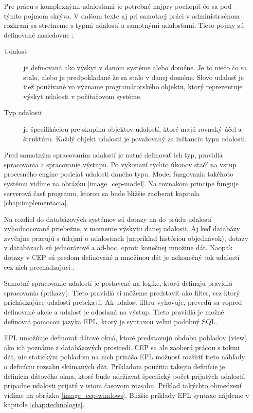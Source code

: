 	Pre prácu s komplexnými udalosťami je potrebné najprv pochopiť čo sa pod týmto pojmom skrýva. V ďalšom texte aj pri samotnej práci v administračnom rozhraní sa stretneme s typmi udalostí a samotnými udalosťami. Tieto pojmy sú definované nasledovne \cite{etzion2011event}:
	
	\begin{description}
		\item[Udalosť] je definovaná ako výskyt v danom systéme alebo doméne. Je to niečo čo sa stalo, alebo je predpokladané že sa stalo v danej doméne. Slovo udalosť je tiež používané vo význame programátorského objektu, ktorý reprezentuje výskyt udalosti v počítačovom systéme.
		
		\item[Typ udalosti] je špecifikáciou pre skupinu objektov udalostí, ktoré majú rovnaký účel a štruktúru. Každý objekt udalosti je považovaný za inštanciu typu udalosti.
	\end{description}

	Pred samotným spracovaním udalostí je nutné definovať ich typ, pravidlá spracovania a spracovanie výstupu. Po vykonaní týchto úkonov stačí na vstup procesného engine posielať udalosti daného typu. Model fungovania takéhoto systému vidíme na obrázku \ref{image_cep-model}. Na rovnakom princípe funguje serverová časť programu, ktorou sa bude bližšie zaoberať kapitola \ref{chap:implementacia}.
	
	Na rozdiel do databázových systémov sú dotazy na do prúdu udalostí vyhodnocované priebežne, v momente výskytu danej udalosti. Aj keď databázy zvyčajne pracujú s údajmi o udalostiach (napríklad históriou objednávok), dotazy v databázach sú jednorázové a ad-hoc, oproti konečnej množine dát. Naopak dotazy v CEP sú predom definované a množinou dát je nekonečný tok udalostí cez nich prechádzajúci \cite{web:ceptranslated}.
		
	Samotné spracovanie udalostí je postavené na logike, ktorú definujú pravidlá spracovania (príkazy). Tieto pravidlá si môžeme predstaviť ako filter, cez ktorý prichádzajúce udalosti pretekajú. Ak udalosť filtru vyhovuje, prevedú sa vopred definované akcie a udalosť je odoslaná na výstup.	Tieto pravidlá je možné definovať pomocou jazyka EPL, ktorý je syntaxou veľmi podobný SQL.
	
	EPL umožňuje definovať dátové okná, ktoré predstavujú obdobu pohľadov (view) ako ich poznáme z databázových prostredí. CEP sa ale zaoberá prácou s tokmi dát, nie statickým pohľadom na nich prináša EPL možnosť rozšíriť tieto náhľady o definíciu rozsahu skúmaných dát. Príkladom použitia takejto definície je definícia dátového okna, ktoré bude udržiavať špecifický počet prijatých udalostí, prípadne udalosti prijaté v istom časovom rozsahu. Príklad takýchto obmedzení vidíme na obrázku \ref{image_cep-windows}. Bližšie príklady EPL syntaxe nájdeme v kapitole \ref{chap:technologie}.

